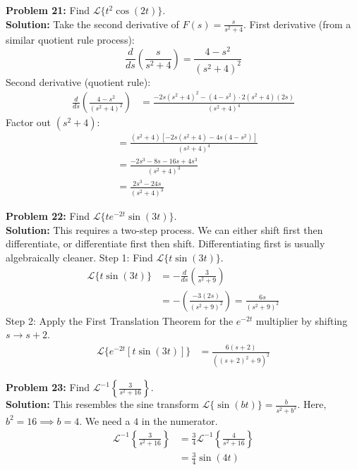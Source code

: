 \documentclass[11pt, letterpaper]{article}
\theoremstyle{definition}
\theoremstyle{remark}
\begin{document}
\vspace{1em}
\textbf{Problem 21:} Find $\mathscr{L}\{t^2\cos(2t)\}$.
\vspace{0.5em} \\
\textbf{Solution:} Take the second derivative of $F(s) = \frac{s}{s^2 + 4}$.
First derivative (from a similar quotient rule process):
\[
\frac{d}{ds}\left(\frac{s}{s^2 + 4}\right) = \frac{4 - s^2}{(s^2 + 4)^2}
\]
Second derivative (quotient rule):
\begin{align*}
    \frac{d}{ds}\left(\frac{4 - s^2}{(s^2 + 4)^2}\right) &= \frac{-2s(s^2 + 4)^2 - (4 - s^2) \cdot 2(s^2 + 4)(2s)}{(s^2 + 4)^4}
\end{align*}
Factor out $(s^2 + 4)$:
\begin{align*}
    &= \frac{(s^2 + 4)[-2s(s^2 + 4) - 4s(4 - s^2)]}{(s^2 + 4)^4} \\[4pt]
    &= \frac{-2s^3 - 8s - 16s + 4s^3}{(s^2 + 4)^3} \\[4pt]
    &= \frac{2s^3 - 24s}{(s^2 + 4)^3}
\end{align*}

\vspace{1em}
\textbf{Problem 22:} Find $\mathscr{L}\{t e^{-2t} \sin(3t)\}$.
\vspace{0.5em} \\
\textbf{Solution:} This requires a two-step process. We can either shift first then differentiate, or differentiate first then shift. Differentiating first is usually algebraically cleaner.
Step 1: Find $\mathscr{L}\{t\sin(3t)\}$.
\begin{align*}
    \mathscr{L}\{t\sin(3t)\} &= -\frac{d}{ds}\left(\frac{3}{s^2 + 9}\right) \\[4pt]
    &= -\left(\frac{-3(2s)}{(s^2 + 9)^2}\right) = \frac{6s}{(s^2 + 9)^2}
\end{align*}
Step 2: Apply the First Translation Theorem for the $e^{-2t}$ multiplier by shifting $s \to s + 2$.
\begin{align*}
    \mathscr{L}\{e^{-2t} [t\sin(3t)]\} &= \frac{6(s + 2)}{((s + 2)^2 + 9)^2}
\end{align*}

\vspace{1em}
\textbf{Problem 23:} Find $\mathscr{L}^{-1}\left\{\frac{3}{s^2 + 16}\right\}$.
\vspace{0.5em} \\
\textbf{Solution:} This resembles the sine transform $\mathscr{L}\{\sin(bt)\} = \frac{b}{s^2 + b^2}$. Here, $b^2 = 16 \implies b = 4$. We need a $4$ in the numerator.
\begin{align*}
    \mathscr{L}^{-1}\left\{\frac{3}{s^2 + 16}\right\} &= \frac{3}{4}\mathscr{L}^{-1}\left\{\frac{4}{s^2 + 16}\right\} \\[4pt]
    &= \frac{3}{4}\sin(4t)
\end{align*}
\end{document}
